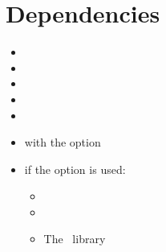 \section{Dependencies}%
\begin{multicols}{2}%
  \begin{itemize}[leftmargin=10pt]
    \item {}
    \item {}
    \item {}
    \item {}
    \item {}
    \item {} with the  option
    \item if the  option is used:
      \begin{itemize}
        \item \TikZ
        \item {}
        \item The \TikZ\ library 
      \end{itemize}
  \end{itemize}
\end{multicols}
